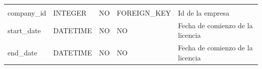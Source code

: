 \documentclass[12pt,a4paperpaper,]{report}
\begin{document}
\begin{longtable}[]{@{}lllll@{}}
\begin{minipage}[t]{0.11\columnwidth}
\end{minipage}\tabularnewline
\begin{minipage}[t]{0.21\columnwidth}\raggedright\strut
company\_id\strut
\end{minipage} & \begin{minipage}[t]{0.19\columnwidth}\raggedright\strut
INTEGER\strut
\end{minipage} & \begin{minipage}[t]{0.16\columnwidth}\raggedright\strut
NO\strut
\end{minipage} & \begin{minipage}[t]{0.19\columnwidth}\raggedright\strut
FOREIGN\_KEY\strut
\end{minipage} & \begin{minipage}[t]{0.11\columnwidth}\raggedright\strut
Id de la empresa\strut
\end{minipage}\tabularnewline
\begin{minipage}[t]{0.21\columnwidth}\raggedright\strut
start\_date\strut
\end{minipage} & \begin{minipage}[t]{0.19\columnwidth}\raggedright\strut
DATETIME\strut
\end{minipage} & \begin{minipage}[t]{0.16\columnwidth}\raggedright\strut
NO\strut
\end{minipage} & \begin{minipage}[t]{0.19\columnwidth}\raggedright\strut
NO\strut
\end{minipage} & \begin{minipage}[t]{0.11\columnwidth}\raggedright\strut
Fecha de comienzo de la licencia\strut
\end{minipage}\tabularnewline
\begin{minipage}[t]{0.21\columnwidth}\raggedright\strut
end\_date\strut
\end{minipage} & \begin{minipage}[t]{0.19\columnwidth}\raggedright\strut
DATETIME\strut
\end{minipage} & \begin{minipage}[t]{0.16\columnwidth}\raggedright\strut
NO\strut
\end{minipage} & \begin{minipage}[t]{0.19\columnwidth}\raggedright\strut
NO\strut
\end{minipage} & \begin{minipage}[t]{0.11\columnwidth}\raggedright\strut
Fecha de comienzo de la licencia\strut
\end{minipage}\tabularnewline
\bottomrule
\end{longtable}
\end{document}
